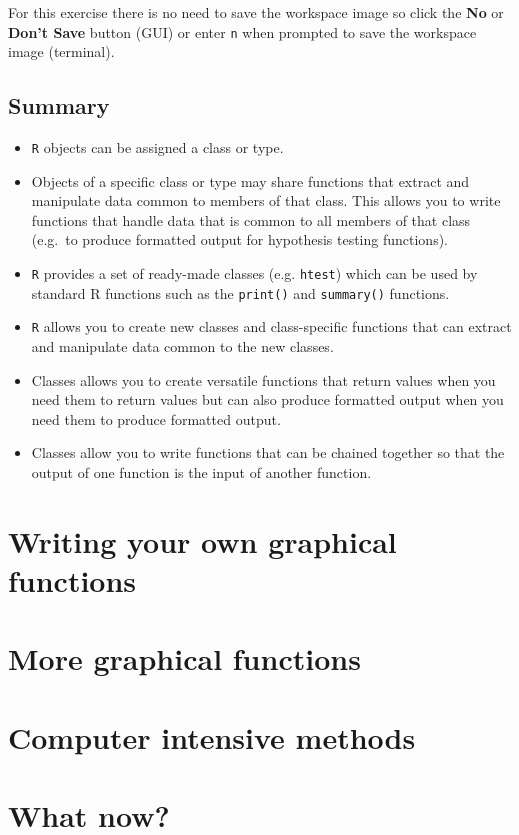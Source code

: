 \documentclass[]{book}
\theoremstyle{definition}
\theoremstyle{definition}
\theoremstyle{definition}
\theoremstyle{remark}
\begin{document}
For this exercise there is no need to save the workspace image so click
the \textbf{No} or \textbf{Don't Save} button (GUI) or enter \texttt{n}
when prompted to save the workspace image (terminal).

\hypertarget{summary-5}{%
\section{Summary}\label{summary-5}}

\begin{itemize}
\item
  \texttt{R} objects can be assigned a class or type.
\item
  Objects of a specific class or type may share functions that extract
  and manipulate data common to members of that class. This allows you
  to write functions that handle data that is common to all members of
  that class (e.g.~to produce formatted output for hypothesis testing
  functions).
\item
  \texttt{R} provides a set of ready-made classes (e.g. \texttt{htest})
  which can be used by standard R functions such as the \texttt{print()}
  and \texttt{summary()} functions.
\item
  \texttt{R} allows you to create new classes and class-specific
  functions that can extract and manipulate data common to the new
  classes.
\item
  Classes allows you to create versatile functions that return values
  when you need them to return values but can also produce formatted
  output when you need them to produce formatted output.
\item
  Classes allow you to write functions that can be chained together so
  that the output of one function is the input of another function.
\end{itemize}

\hypertarget{exercise7}{%
\chapter{Writing your own graphical functions}\label{exercise7}}

\hypertarget{exercise8}{%
\chapter{More graphical functions}\label{exercise8}}

\hypertarget{exercise9}{%
\chapter{Computer intensive methods}\label{exercise9}}

\hypertarget{whatnow}{%
\chapter{What now?}\label{whatnow}}


\end{document}
